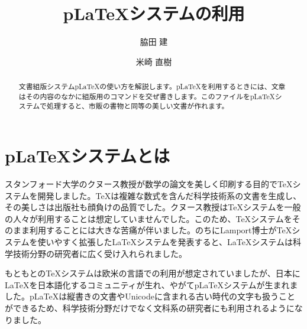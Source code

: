 \documentclass[a4j,12pt]{jarticle}
\title {pLaTeXシステムの利用}
\author {脇田 建 \and 米崎 直樹}
\date {}
\begin{document}
\maketitle

\begin {abstract}
文書組版システムpLaTeXの使い方を解説します。pLaTeXを利用するときには、文章はその内容のなかに組版用のコマンドを交ぜ書きします。このファイルをpLaTeXシステムで処理すると、市販の書物と同等の美しい文書が作れます。
\end {abstract}

\section {pLaTeXシステムとは}

スタンフォード大学のクヌース教授が数学の論文を美しく印刷する目的でTeXシステムを開発しました。TeXは複雑な数式を含んだ科学技術系の文書を生成し、その美しさは出版社も顔負けの品質でした。クヌース教授はTeXシステムを一般の人々が利用することは想定していませんでした。このため、TeXシステムをそのまま利用することには大きな苦痛が伴いました。のちにLamport博士がTeXシステムを使いやすく拡張したLaTeXシステムを発表すると、LaTeXシステムは科学技術分野の研究者に広く受け入れられました。

もともとのTeXシステムは欧米の言語での利用が想定されていましたが、日本にLaTeXを日本語化するコミュニティが生れ、やがてpLaTeXシステムが生まれました。pLaTeXは縦書きの文書やUnicodeに含まれる古い時代の文字も扱うことができるため、科学技術分野だけでなく文科系の研究者にも利用されるようになりました。
\end{document}
